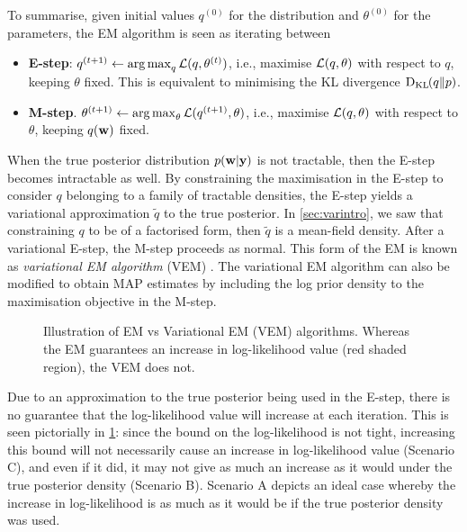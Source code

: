To summarise, given initial values $q^{(0)}$ for the distribution  and $\theta^{(0)}$ for the parameters, the EM algorithm is seen as iterating between
\begin{itemize}
  \item \textbf{E-step}: $q^{(t+1)} \gets \operatorname*{arg\,max}_q {\mathcal L}(q,\theta^{(t)})$, i.e., maximise ${\mathcal L}(q,\theta)$ with respect to $q$, keeping $\theta$ fixed. This is equivalent to minimising the KL divergence $\operatorname{D_{KL}\hspace{-1pt}}(q\Vert p)$.
  \item \textbf{M-step}. $\theta^{(t+1)} \gets \operatorname*{arg\,max}_\theta {\mathcal L}(q^{(t+1)},\theta)$, i.e., maximise ${\mathcal L}(q,\theta)$ with respect to $\theta$, keeping $q({\mathbf w})$ fixed.
\end{itemize}

When the true posterior distribution $p({\mathbf w}|{\mathbf y})$ is not tractable, then the E-step becomes intractable as well.
By constraining the maximisation in the E-step to consider $q$ belonging to a family of tractable densities, the E-step yields a variational approximation $\tilde q$ to the true posterior.
In \cref{sec:varintro}, we saw that constraining $q$ to be of a factorised form, then $\tilde q$ is a mean-field density.
After a variational E-step, the M-step proceeds as normal.
This form of the EM is known as \emph{variational EM algorithm} (VEM) \citep{beal2003variational}.
The variational EM algorithm can also be modified to obtain MAP estimates by including the log prior density to the maximisation objective in the M-step.

\begin{figure}[p]\label{fig:emVSvem}
  \centering
  \energyemEstep \hspace{0.5cm}
  \energyvbEstep
  \energyemMstep \hspace{0.5cm}
  \energyvbMstepa
  \energyemMstepfade \hspace{0.5cm}
  \energyvbMstepb
  \energyemMstepfade \hspace{0.5cm}
  \energyvbMstepc
  \vspace{-0.5em} 
  \caption[Illustration of EM vs Variational EM algorithms]{Illustration of EM vs Variational EM (VEM) algorithms. Whereas the EM guarantees an increase in log-likelihood value (red shaded region), the VEM does not.}
\end{figure}

Due to an approximation to the true posterior being used in the E-step, there is no guarantee that the log-likelihood value will increase at each iteration.
This is seen pictorially in \cref{fig:emVSvem}: since the bound on the log-likelihood is not tight, increasing this bound will not necessarily cause an increase in log-likelihood value (Scenario C), and even if it did, it may not give as much an increase as it would under the true posterior density (Scenario B).
Scenario A depicts an ideal case whereby the increase in log-likelihood is as much as it would be if the true posterior density was used.

